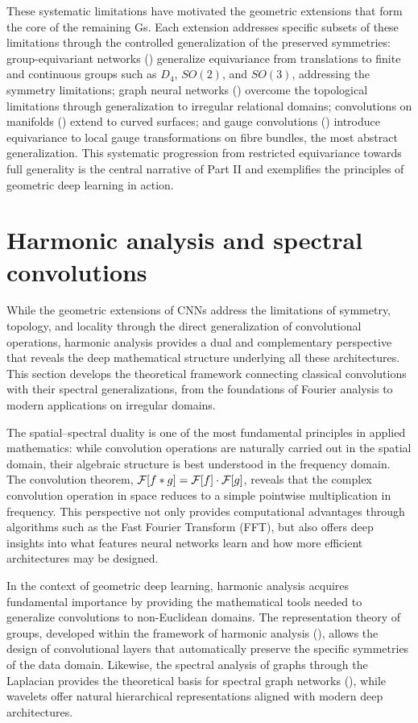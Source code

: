 These systematic limitations have motivated the geometric extensions that form
the core of the remaining Gs. Each extension addresses specific subsets of these
limitations through the controlled generalization of the preserved symmetries:
group-equivariant networks () generalize equivariance from
translations to finite and continuous groups such as $D_4$, $SO(2)$, and
$SO(3)$, addressing the symmetry limitations; graph neural networks
() overcome the topological limitations through generalization
to irregular relational domains; convolutions on manifolds
() extend to curved surfaces; and gauge convolutions
() introduce equivariance to local gauge transformations on
fibre bundles, the most abstract generalization. This systematic progression
from restricted equivariance towards full generality is the central narrative of
Part II and exemplifies the principles of geometric deep learning in action.

\section{Harmonic analysis and spectral convolutions}
\label{sec:grids:harmonic}

While the geometric extensions of CNNs address the limitations of symmetry,
topology, and locality through the direct generalization of convolutional
operations, harmonic analysis provides a dual and complementary perspective that
reveals the deep mathematical structure underlying all these architectures. This
section develops the theoretical framework connecting classical convolutions
with their spectral generalizations, from the foundations of Fourier analysis to
modern applications on irregular domains.

The spatial--spectral duality is one of the most fundamental principles in
applied mathematics: while convolution operations are naturally carried out in
the spatial domain, their algebraic structure is best understood in the
frequency domain. The convolution theorem,
$\mathcal{F}[f * g] = \mathcal{F}[f] \cdot \mathcal{F}[g]$, reveals that the complex convolution
operation in space reduces to a simple pointwise multiplication in frequency.
This perspective not only provides computational advantages through algorithms
such as the Fast Fourier Transform (FFT), but also offers deep insights into
what features neural networks learn and how more efficient architectures may be
designed.

In the context of geometric deep learning, harmonic analysis acquires
fundamental importance by providing the mathematical tools needed to generalize
convolutions to non-Euclidean domains. The representation theory of groups,
developed within the framework of harmonic analysis (),
allows the design of convolutional layers that automatically preserve the
specific symmetries of the data domain. Likewise, the spectral analysis of
graphs through the Laplacian provides the theoretical basis for spectral graph
networks (), while wavelets offer natural hierarchical
representations aligned with modern deep architectures.

